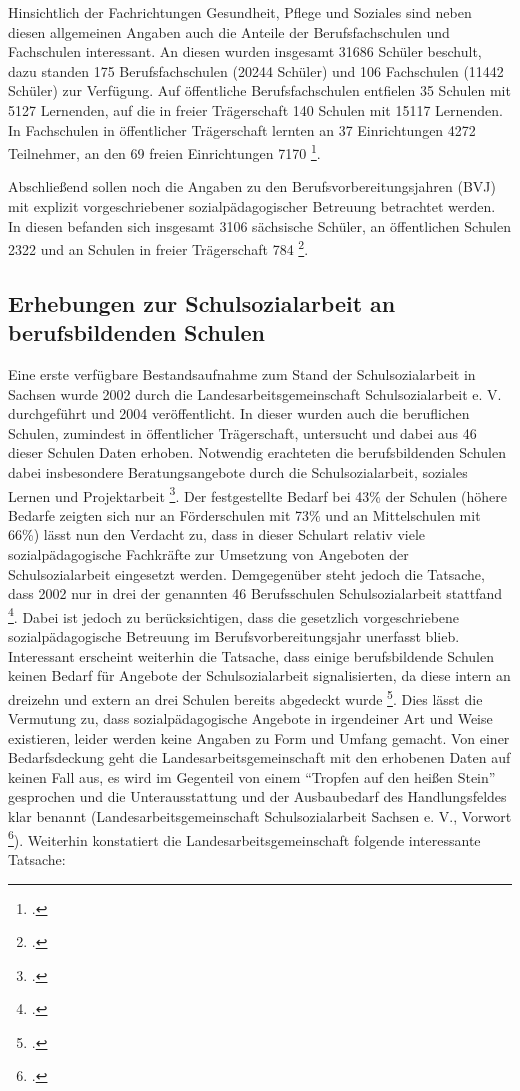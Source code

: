 Hinsichtlich der Fachrichtungen Gesundheit, Pflege und Soziales sind neben diesen allgemeinen Angaben auch die Anteile der Berufsfachschulen und Fachschulen interessant. An diesen wurden insgesamt 31686 Schüler beschult, dazu standen 175 Berufsfachschulen (20244 Schüler) und 106 Fachschulen (11442 Schüler) zur Verfügung. Auf öffentliche Berufsfachschulen entfielen 35 Schulen mit 5127 Lernenden, auf die in freier Trägerschaft 140 Schulen mit 15117 Lernenden. In Fachschulen in öffentlicher Trägerschaft lernten an 37 Einrichtungen 4272 Teilnehmer, an den 69 freien Einrichtungen 7170 \footcite[vgl.][286ff]{SLFS2015}. 

Abschließend sollen noch die Angaben zu den Berufsvorbereitungsjahren (BVJ) mit explizit vorgeschriebener sozialpädagogischer Betreuung betrachtet werden. In diesen befanden sich insgesamt 3106 sächsische Schüler, an öffentlichen Schulen 2322 und an Schulen in freier Trägerschaft 784 \footcite[vgl.][286ff]{SLFS2015}. 

\subsection{Erhebungen zur Schulsozialarbeit an berufsbildenden Schulen}
\label{sec:ErhebungenZurSchulsozialarbeitAnBerufsbildendenSchulen}

Eine erste verfügbare Bestandsaufnahme zum Stand der Schulsozialarbeit in Sachsen wurde 2002 durch die Landesarbeitsgemeinschaft Schulsozialarbeit e. V. durchgeführt und 2004 veröffentlicht. In dieser wurden auch die beruflichen Schulen, zumindest in öffentlicher Trägerschaft, untersucht und dabei aus 46 dieser Schulen Daten erhoben. Notwendig erachteten die berufsbildenden Schulen dabei insbesondere Beratungsangebote durch die Schulsozialarbeit, soziales Lernen und Projektarbeit \footcite[vgl.][6ff]{LSS2004}. Der festgestellte Bedarf bei 43\% der Schulen (höhere Bedarfe zeigten sich nur an Förderschulen mit 73\% und an Mittelschulen mit 66\%) lässt nun den Verdacht zu, dass in dieser Schulart relativ viele sozialpädagogische Fachkräfte zur Umsetzung von Angeboten der Schulsozialarbeit eingesetzt werden. Demgegenüber steht jedoch die Tatsache, dass 2002 nur in drei der genannten 46 Berufsschulen Schulsozialarbeit stattfand \footcite[vgl.][6ff]{LSS2004}. Dabei ist jedoch zu berücksichtigen, dass die gesetzlich vorgeschriebene sozialpädagogische Betreuung im Berufsvorbereitungsjahr unerfasst blieb. Interessant erscheint weiterhin die Tatsache, dass einige berufsbildende Schulen keinen Bedarf für Angebote der Schulsozialarbeit signalisierten, da diese intern an dreizehn und extern an drei Schulen bereits abgedeckt wurde \footcite[vgl.][5]{LSS2004}. Dies lässt die Vermutung zu, dass sozialpädagogische Angebote in irgendeiner Art und Weise existieren, leider werden keine Angaben zu Form und Umfang gemacht. Von einer Bedarfsdeckung geht die Landesarbeitsgemeinschaft mit den erhobenen Daten auf keinen Fall aus, es wird im Gegenteil von einem "`Tropfen auf den heißen Stein"' gesprochen und die Unterausstattung und der Ausbaubedarf des Handlungsfeldes klar benannt (Landesarbeitsgemeinschaft Schulsozialarbeit Sachsen e. V., Vorwort \footcite[vgl.]{LSS2004}). Weiterhin konstatiert die Landesarbeitsgemeinschaft folgende interessante Tatsache: 

